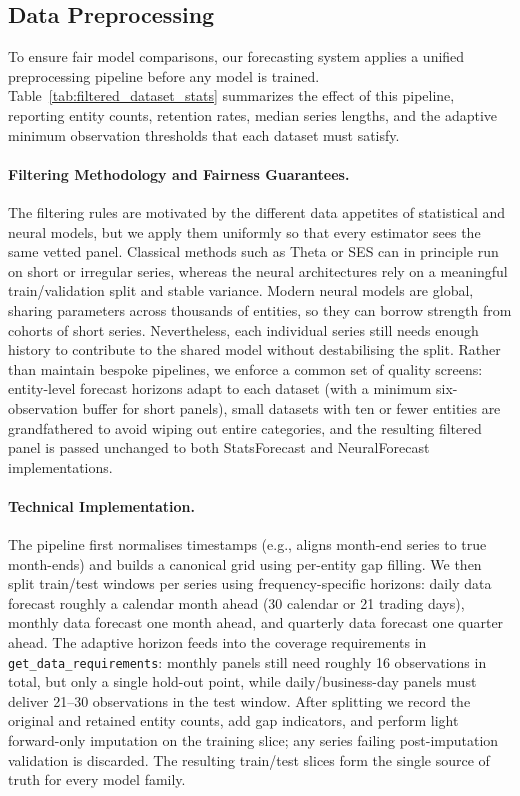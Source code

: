 \documentclass{article}
\begin{document}
\subsection{Data Preprocessing}

To ensure fair model comparisons, our forecasting system applies a unified preprocessing pipeline before any model is trained. Table~\ref{tab:filtered_dataset_stats} summarizes the effect of this pipeline, reporting entity counts, retention rates, median series lengths, and the adaptive minimum observation thresholds that each dataset must satisfy.

\paragraph{Filtering Methodology and Fairness Guarantees.} The filtering rules are motivated by the different data appetites of statistical and neural models, but we apply them uniformly so that every estimator sees the same vetted panel. Classical methods such as Theta or SES can in principle run on short or irregular series, whereas the neural architectures rely on a meaningful train/validation split and stable variance. Modern neural models are global, sharing parameters across thousands of entities, so they can borrow strength from cohorts of short series. Nevertheless, each individual series still needs enough history to contribute to the shared model without destabilising the split. Rather than maintain bespoke pipelines, we enforce a common set of quality screens: entity-level forecast horizons adapt to each dataset (with a minimum six-observation buffer for short panels), small datasets with ten or fewer entities are grandfathered to avoid wiping out entire categories, and the resulting filtered panel is passed unchanged to both StatsForecast and NeuralForecast implementations.

\paragraph{Technical Implementation.} The pipeline first normalises timestamps (e.g., aligns month-end series to true month-ends) and builds a canonical grid using per-entity gap filling. We then split train/test windows per series using frequency-specific horizons: daily data forecast roughly a calendar month ahead (30 calendar or 21 trading days), monthly data forecast one month ahead, and quarterly data forecast one quarter ahead. The adaptive horizon feeds into the coverage requirements in \texttt{get\_data\_requirements}: monthly panels still need roughly 16 observations in total, but only a single hold-out point, while daily/business-day panels must deliver 21--30 observations in the test window. After splitting we record the original and retained entity counts, add gap indicators, and perform light forward-only imputation on the training slice; any series failing post-imputation validation is discarded. The resulting train/test slices form the single source of truth for every model family.
\end{document}
